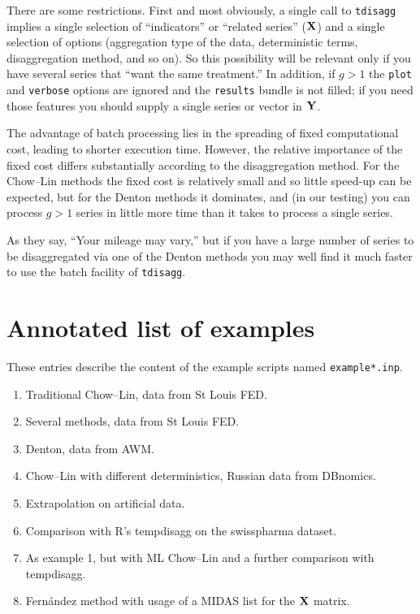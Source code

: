 There are some restrictions. First and most obviously, a single call
to \texttt{tdisagg} implies a single selection of ``indicators'' or
``related series'' ($\mathbf{X}$) and a single selection of options
(aggregation type of the data, deterministic terms, disaggregation
method, and so on). So this possibility will be relevant only if you
have several series that ``want the same treatment.'' In addition, if
$g > 1$ the \texttt{plot} and \texttt{verbose} options are ignored and
the \texttt{results} bundle is not filled; if you need those features
you should supply a single series or vector in $\mathbf{Y}$.

The advantage of batch processing lies in the spreading of fixed
computational cost, leading to shorter execution time. However, the
relative importance of the fixed cost differs substantially according
to the disaggregation method. For the Chow--Lin methods the fixed cost
is relatively small and so little speed-up can be expected, but for
the Denton methods it dominates, and (in our testing) you can process
$g > 1$ series in little more time than it takes to process a single
series.

As they say, ``Your mileage may vary,'' but if you have a large number
of series to be disaggregated via one of the Denton methods you may
well find it much faster to use the batch facility of
\texttt{tdisagg}.

\section{Annotated list of examples}
\label{sec:tdisagg-examples}

These entries describe the content of the example scripts named
\texttt{example*.inp}.

\begin{enumerate}
\item Traditional Chow--Lin, data from St Louis FED.
\item Several methods, data from St Louis FED.
\item Denton, data from AWM.
\item Chow--Lin with different deterministics, Russian data from DBnomics.
\item Extrapolation on artificial data.
\item Comparison with R's \textsf{tempdisagg} on the
  \textsf{swisspharma} dataset.
\item As example 1, but with ML Chow--Lin and a further
  comparison with \textsf{tempdisagg}.
\item Fern\'andez method with usage of a MIDAS list for the $\mathbf{X}$ matrix.
\end{enumerate}
